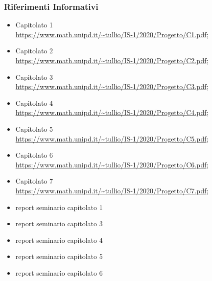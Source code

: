 \subsubsection{Riferimenti Informativi}
\begin{itemize}
	\item{Capitolato 1\\
		\url{https://www.math.unipd.it/~tullio/IS-1/2020/Progetto/C1.pdf}};
	\item{Capitolato 2\\
		\url{https://www.math.unipd.it/~tullio/IS-1/2020/Progetto/C2.pdf}};
	\item{Capitolato 3\\
		\url{https://www.math.unipd.it/~tullio/IS-1/2020/Progetto/C3.pdf}};
	\item{Capitolato 4\\
		\url{https://www.math.unipd.it/~tullio/IS-1/2020/Progetto/C4.pdf}};
	\item{Capitolato 5\\
		\url{https://www.math.unipd.it/~tullio/IS-1/2020/Progetto/C5.pdf}};
	\item{Capitolato 6\\
		\url{https://www.math.unipd.it/~tullio/IS-1/2020/Progetto/C6.pdf}};
	\item{Capitolato 7\\
		\url{https://www.math.unipd.it/~tullio/IS-1/2020/Progetto/C7.pdf}};
	\item report seminario capitolato 1 %
	\item report seminario capitolato 3
	\item report seminario capitolato 4
	\item report seminario capitolato 5
	\item report seminario capitolato 6
\end{itemize}

